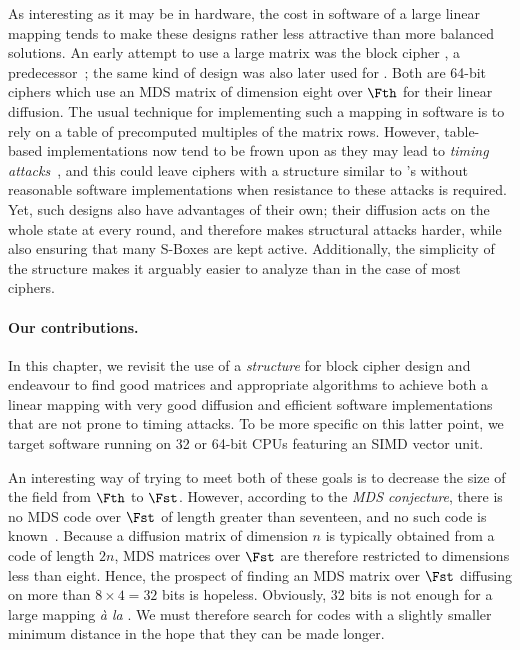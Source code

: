 As interesting as it may be in hardware, the cost in software of a large linear mapping tends to make these designs rather less attractive than more balanced solutions.
An early attempt to use a large matrix was the block cipher \shark{}, a \rijndael{} predecessor~\cite{shark}; the same kind of design
was also later used for \khazad. Both are  64-bit ciphers which use an MDS matrix of dimension
eight over $\Fth$ for their linear diffusion. The usual technique for implementing such a mapping in software is to rely on a table of precomputed multiples of
the matrix rows. However, table-based implementations now tend to be frown upon as they may lead to \emph{timing attacks}~\cite{timinattacks}, and this could
leave ciphers with a structure similar to \shark{}'s without reasonable software implementations when resistance to these attacks is required.
Yet, such designs also have advantages of their own; their diffusion acts on the whole state at every round, and therefore makes structural attacks harder,
while also ensuring that many S-Boxes are kept active.
Additionally, the simplicity of the structure makes it arguably easier to analyze than in the case of most ciphers.

\paragraph{Our contributions.}

In this chapter, we revisit the use of a \emph{\shark{} structure} for block cipher design and endeavour to find good matrices and appropriate algorithms
to achieve both a linear mapping with very good diffusion and efficient software implementations that are not prone to timing attacks.
To be more specific on this latter point, we target software running on 32 or 64-bit CPUs featuring an SIMD vector unit.

An interesting way of trying to meet both of these goals is to decrease the size of the field from $\Fth$ to $\Fst$. However, according to the \emph{MDS conjecture},
there is no MDS code over $\Fst$ of length greater than seventeen, and no such code is known~\cite{mdsConj}. Because a diffusion matrix of dimension $n$ is typically
obtained from a code of length $2n$, MDS matrices over $\Fst$ are therefore restricted to dimensions less than eight. Hence, the prospect
of finding an MDS matrix over $\Fst$ diffusing on more than $8\times4 = 32$ bits is hopeless.
Obviously,
32 bits is not enough for a large mapping \emph{à la} \shark{}. We must therefore search for codes with a slightly smaller minimum distance
in the hope that they can be made longer.

